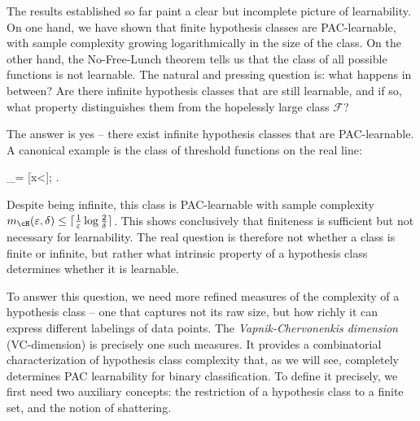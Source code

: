 %
%
%
The results established so far paint a clear but incomplete picture of learnability. On one hand, we have shown that finite hypothesis classes are PAC-learnable, with sample complexity growing logarithmically in the size of the class. On the other hand, the No-Free-Lunch theorem tells us that the class of all possible functions is not learnable. The natural and pressing question is: what happens in between? Are there infinite hypothesis classes that are still learnable, and if so, what property distinguishes them from the hopelessly large class $\mathcal{F}$?

The answer is yes -- there exist infinite hypothesis classes that are PAC-learnable. A canonical example is the class of threshold functions on the real line:
\begin{myequation}
\cH_\theta = [x<\theta]; \theta\in\Real\rbrace.
\end{myequation}
Despite being infinite, this class is PAC-learnable with sample complexity $m_\cH(\varepsilon,\delta) \leq \lceil \frac{1}{\varepsilon}\log\frac{2}{\delta}\rceil$. This shows conclusively that finiteness is sufficient but not necessary for learnability. The real question is therefore not whether a class is finite or infinite, but rather what intrinsic property of a hypothesis class determines whether it is learnable.

To answer this question, we need more refined measures of the complexity of a hypothesis class -- one that captures not its raw size, but how richly it can express different labelings of data points. The \emph{Vapnik-Chervonenkis dimension} (VC-dimension) is precisely one such measures. It provides a combinatorial characterization of hypothesis class complexity that, as we will see, completely determines PAC learnability for binary classification. To define it precisely, we first need two auxiliary concepts: the restriction of a hypothesis class to a finite set, and the notion of shattering.

